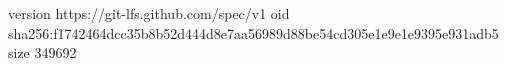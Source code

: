 version https://git-lfs.github.com/spec/v1
oid sha256:f1742464dcc35b8b52d444d8e7aa56989d88be54cd305e1e9e1e9395e931adb5
size 349692
